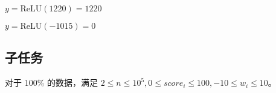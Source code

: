 \examplebox*{}{}

$y = \mathrm{ReLU}(1220)=1220$

\examplebox*{}{}

$y = \mathrm{ReLU}(-1015)=0$

\subsection*{子任务}

对于 $100\%$ 的数据，满足 $2\le n\le 10^5, 0\le score_i\le 100, -10\le w_i\le 10$。